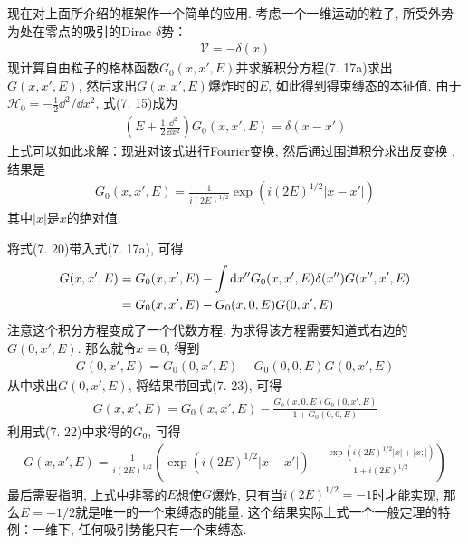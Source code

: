 现在对上面所介绍的框架作一个简单的应用. 
考虑一个一维运动的粒子, 
所受外势为处在零点的吸引的Dirac $\delta$势：
\begin{align}
\mathscr{V} = -\delta(x)
\end{align}
现计算自由粒子的格林函数$G_0(x,x',E)$并求解积分方程(7.
17a)求出$G(x,x',E)$, 
然后求出$G(x,x',E)$爆炸时的$E$, 
如此得到得束缚态的本征值. 
由于$\mathscr{H}_0 = -\frac{1}{2}\dd^2/\dd x^2$, 
式(7.
15)成为
\begin{align}
\left( E + \frac{1}{2}\frac{\dd^2}{\dd x^2} \right) G_0(x,x',E) = \delta(x-x')
\end{align}
上式可以如此求解：现进对该式进行Fourier变换, 
然后通过围道积分求出反变换
. 结果是
\begin{align}
G_0(x,x',E) = \frac{1}{i(2E)^{1/2}}\exp(i(2E)^{1/2}|x-x'|)
\end{align}
其中$|x|$是$x$的绝对值.


将式(7.
20)带入式(7.
17a), 
可得
\begin{align}
G(x,x',E) & = G_0(x,x',E) - \int\dd x''G_0(x,x',E)\delta(x'')G(x'',x',E)\notag\\
          & = G_0(x,x',E) - G_0(x,0,E)G(0,x',E)
\end{align}
注意这个积分方程变成了一个代数方程. 
为求得该方程需要知道式右边的$G(0,x',E)$. 
那么就令$x=0$, 
得到
\begin{align}
G(0,x',E) = G_0(0,x',E) - G_0(0,0,E)G(0,x',E)
\end{align}
从中求出$G(0,x',E)$, 
将结果带回式(7.
23), 
可得
\begin{align}
G(x,x',E) = G_0(x,x',E) - \frac{G_0(x,0,E) G_0(0,x',E)}{1 + G_0(0,0,E)}
\end{align}
利用式(7.
22)中求得的$G_0$, 
可得
\begin{align*}
G(x,x',E) = \frac{1}{i(2E)^{1/2}} \left( \exp(i(2E)^{1/2}|x-x'|) - \frac{\exp(i(2E)^{1/2}|x|+|x;|)}{1+i(2E)^{1/2}} \right)
\end{align*}
最后需要指明, 
上式中非零的$E$想使$G$爆炸, 
只有当$i(2E)^{1/2}=-1$时才能实现, 
那么$E=-1/2$就是唯一的一个束缚态的能量. 
这个结果实际上式一个一般定理的特例：一维下, 
任何吸引势能只有一个束缚态.

